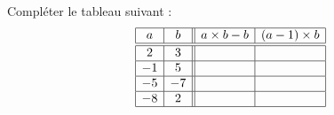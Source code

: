 
\begin{exercice}\label{exosmath-0755}

Compléter le tableau suivant :
\begin{equation*}
    \begin{array}[]{|c|c||c|c|}
        \hline
        a&b&a\times b-b&(a-1)\times b\\
        \hline\hline
        2&3&&\\
        \hline
        -1&5&&\\
        \hline
        -5&-7&&\\
        \hline
        -8&2&&\\
        \hline
    \end{array}
\end{equation*}

\end{exercice}
